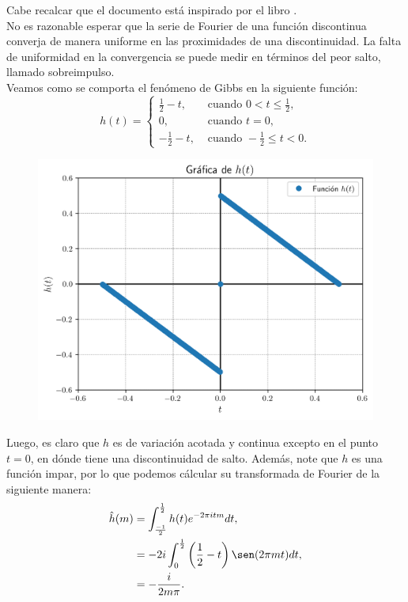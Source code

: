 Cabe recalcar que el documento está inspirado por el libro \cite{zbMATH05294798}.\\
No es razonable esperar que la serie de Fourier de una función discontinua converja de manera uniforme en las proximidades de una discontinuidad. La falta de uniformidad en la convergencia se puede medir en términos del peor salto, llamado sobreimpulso.\\
Veamos como se comporta el fenómeno de Gibbs en la siguiente función:
\begin{equation}\label{eq:h}
  h(t)= 
  \begin{cases}
    \frac{1}{2}-t, &\text{ cuando } 0<t\leq \frac{1}{2} \text{,} \\
    0, &\text{ cuando } t=0,\\
    -\frac{1}{2}-t, &\text{ cuando }-\frac{1}{2}\leq t<0.
  \end{cases}
\end{equation}
\begin{figure}[H]
\begin{center}
  \includegraphics[scale=0.5]{Figures/h.png}
\end{center}
\end{figure}
Luego, es claro que $h$ es de variación acotada y continua excepto en el punto $t=0$, en dónde tiene una discontinuidad de salto. Además, note que $h$ es una función impar, por lo que podemos cálcular su transformada de Fourier de la siguiente manera:
\begin{equation}\label{eq:h_transformada}
  \begin{split}
    \hat{h}(m)&=\int_{\frac{-1}{2}}^{\frac{1}{2}}h(t)e^{-2\pi itm}dt,\\
    &=-2i \int_{0}^{\frac{1}{2}}\left( \frac{1}{2}-t \right)\sen(2\pi mt)dt,\\
    &=-\frac{i}{2m\pi}.  
  \end{split}
\end{equation}
